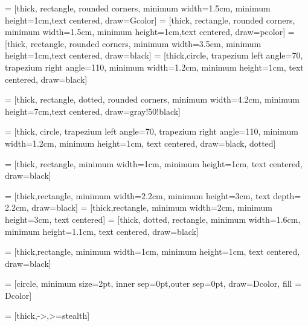 




 = [thick, rectangle, rounded corners, minimum width=1.5cm, minimum height=1cm,text centered, draw=Gcolor]
 = [thick, rectangle, rounded corners, minimum width=1.5cm, minimum height=1cm,text centered, draw=pcolor]
 = [thick, rectangle, rounded corners, minimum width=3.5cm, minimum height=1cm,text centered, draw=black]
 = [thick,circle, trapezium left angle=70, trapezium right angle=110, minimum width=1.2cm, minimum height=1cm, text centered, draw=black]

 = [thick, rectangle, dotted, rounded corners, minimum width=4.2cm, minimum height=7cm,text centered, draw=gray!50!black]

 = [thick, circle, trapezium left angle=70, trapezium right angle=110, minimum width=1.2cm, minimum height=1cm, text centered, draw=black, dotted]

 = [thick, rectangle, minimum width=1cm, minimum height=1cm, text centered, draw=black]

 = [thick,rectangle, minimum width=2.2cm, minimum height=3cm, text depth= 2.2cm, draw=black]
 = [thick,rectangle, minimum width=2cm, minimum height=3cm, text centered]
 = [thick, dotted, rectangle, minimum width=1.6cm, minimum height=1.1cm, text centered, draw=black]


 = [thick,rectangle, minimum width=1cm, minimum height=1cm, text centered, draw=black]


 = [circle, minimum size=2pt, inner sep=0pt,outer sep=0pt, draw=Dcolor, fill = Dcolor]

 = [thick,->,>=stealth]

